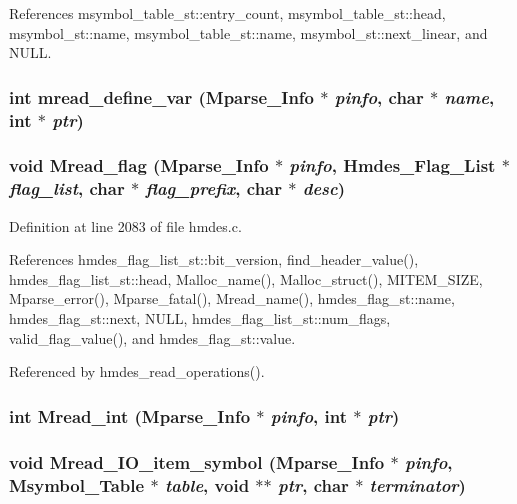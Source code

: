 References msymbol\_\-table\_\-st::entry\_\-count, msymbol\_\-table\_\-st::head, msymbol\_\-st::name, msymbol\_\-table\_\-st::name, msymbol\_\-st::next\_\-linear, and NULL.
\subsubsection{\setlength{\rightskip}{0pt plus 5cm}int mread\_\-define\_\-var (\bf{Mparse\_\-Info} $\ast$ {\em pinfo}, char $\ast$ {\em name}, int $\ast$ {\em ptr})}\label{hmdes_8h_863ffb908bbc23df92008f34e8650173}


\subsubsection{\setlength{\rightskip}{0pt plus 5cm}void Mread\_\-flag (\bf{Mparse\_\-Info} $\ast$ {\em pinfo}, \bf{Hmdes\_\-Flag\_\-List} $\ast$ {\em flag\_\-list}, char $\ast$ {\em flag\_\-prefix}, char $\ast$ {\em desc})}\label{hmdes_8h_bfe7010416fe99e78e226c8f3a71815a}




Definition at line 2083 of file hmdes.c.

References hmdes\_\-flag\_\-list\_\-st::bit\_\-version, find\_\-header\_\-value(), hmdes\_\-flag\_\-list\_\-st::head, Malloc\_\-name(), Malloc\_\-struct(), MITEM\_\-SIZE, Mparse\_\-error(), Mparse\_\-fatal(), Mread\_\-name(), hmdes\_\-flag\_\-st::name, hmdes\_\-flag\_\-st::next, NULL, hmdes\_\-flag\_\-list\_\-st::num\_\-flags, valid\_\-flag\_\-value(), and hmdes\_\-flag\_\-st::value.

Referenced by hmdes\_\-read\_\-operations().
\subsubsection{\setlength{\rightskip}{0pt plus 5cm}int Mread\_\-int (\bf{Mparse\_\-Info} $\ast$ {\em pinfo}, int $\ast$ {\em ptr})}\label{hmdes_8h_21167fd2307af816d91d77546db04321}


\subsubsection{\setlength{\rightskip}{0pt plus 5cm}void Mread\_\-IO\_\-item\_\-symbol (\bf{Mparse\_\-Info} $\ast$ {\em pinfo}, \bf{Msymbol\_\-Table} $\ast$ {\em table}, void $\ast$$\ast$ {\em ptr}, char $\ast$ {\em terminator})}\label{hmdes_8h_a4ef52a27eef051d7a947f6dfe72b35d}




